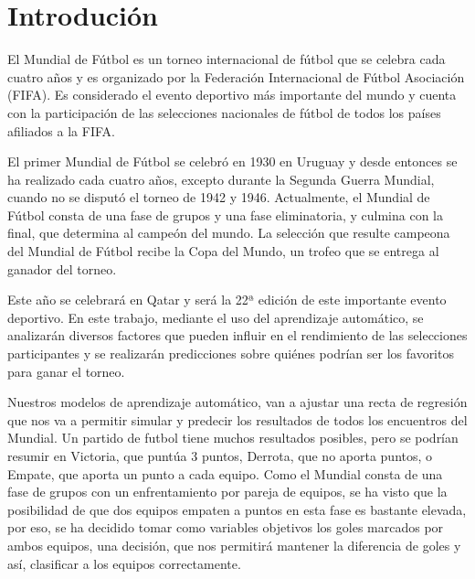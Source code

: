 \section{Introdución}

El Mundial de Fútbol es un torneo internacional de fútbol que se celebra cada cuatro años y es organizado por la Federación Internacional de Fútbol Asociación (FIFA). Es considerado el evento deportivo más importante del mundo y cuenta con la participación de las selecciones nacionales de fútbol de todos los países afiliados a la FIFA.
\newline

El primer Mundial de Fútbol se celebró en 1930 en Uruguay y desde entonces se ha realizado cada cuatro años, excepto durante la Segunda Guerra Mundial, cuando no se disputó el torneo de 1942 y 1946. Actualmente, el Mundial de Fútbol consta de una fase de grupos y una fase eliminatoria, y culmina con la final, que determina al campeón del mundo. La selección que resulte campeona del Mundial de Fútbol recibe la Copa del Mundo, un trofeo que se entrega al ganador del torneo.
\newline

Este año se celebrará en Qatar y será la 22ª edición de este importante evento deportivo. En este trabajo, mediante el uso del aprendizaje automático, se analizarán diversos factores que pueden influir en el rendimiento de las selecciones participantes y se realizarán predicciones sobre quiénes podrían ser los favoritos para ganar el torneo.
\newline

Nuestros modelos de aprendizaje automático, van a ajustar una recta de regresión que nos va a permitir simular y predecir los resultados de todos los encuentros del Mundial. Un partido de futbol tiene muchos resultados posibles, pero se podrían resumir en Victoria, que puntúa 3 puntos, Derrota, que no aporta puntos, o Empate, que aporta un punto a cada equipo. Como el Mundial consta de una fase de grupos con un enfrentamiento por pareja de equipos, se ha visto que la posibilidad de que dos equipos empaten a puntos en esta fase es bastante elevada, por eso, se ha decidido tomar como variables objetivos los goles marcados por ambos equipos, una decisión, que nos permitirá mantener la diferencia de goles y así, clasificar a los equipos correctamente.
\newpage